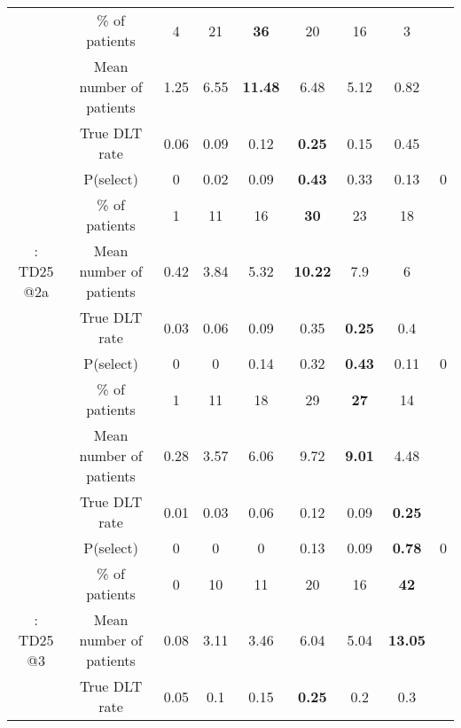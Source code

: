 \begin{table}[h!]
\begin{singlespace}
{\begin{tabular}[t]{ccccccccc}
			\rowcolor{gray!6}   & \% of patients & 4 & 21 & \textbf{36} & 20 & 16 & 3 & \\
			
			\rowcolor{gray!6}  \multirow{-4}{*}{\centering\arraybackslash 11: TD25 @1} & Mean number of patients & 1.25 & 6.55 & \textbf{11.48} & 6.48 & 5.12 & 0.82 & \\
			\cmidrule{1-9}
			& True DLT rate & 0.06 & 0.09 & 0.12 & \textbf{0.25} & 0.15 & 0.45 & \\
			
			& P(select) & 0 & 0.02 & 0.09 & \textbf{0.43} & 0.33 & 0.13 & 0\\
			
			& \% of patients & 1 & 11 & 16 & \textbf{30} & 23 & 18 & \\
			
			\multirow{-4}{*}{\centering\arraybackslash 12: TD25 @2a} & Mean number of patients & 0.42 & 3.84 & 5.32 & \textbf{10.22} & 7.9 & 6 & \\
			\cmidrule{1-9}
			\rowcolor{gray!6}   & True DLT rate & 0.03 & 0.06 & 0.09 & 0.35 & \textbf{0.25} & 0.4 & \\
			
			\rowcolor{gray!6}   & P(select) & 0 & 0 & 0.14 & 0.32 & \textbf{0.43} & 0.11 & 0\\
			
			\rowcolor{gray!6}   & \% of patients & 1 & 11 & 18 & 29 & \textbf{27} & 14 & \\
			
			\rowcolor{gray!6}  \multirow{-4}{*}{\centering\arraybackslash 13: TD25 @2b} & Mean number of patients & 0.28 & 3.57 & 6.06 & 9.72 & \textbf{9.01} & 4.48 & \\
			\cmidrule{1-9}
			& True DLT rate & 0.01 & 0.03 & 0.06 & 0.12 & 0.09 & \textbf{0.25} & \\
			
			& P(select) & 0 & 0 & 0 & 0.13 & 0.09 & \textbf{0.78} & 0\\
			
			& \% of patients & 0 & 10 & 11 & 20 & 16 & \textbf{42} & \\
			
			\multirow{-4}{*}{\centering\arraybackslash 14: TD25 @3} & Mean number of patients & 0.08 & 3.11 & 3.46 & 6.04 & 5.04 & \textbf{13.05} & \\
			\cmidrule{1-9}
			\rowcolor{gray!6}   & True DLT rate & 0.05 & 0.1 & 0.15 & \textbf{0.25} & 0.2 & 0.3 & \\
			

\end{tabular}}
\end{singlespace}
\end{table}
